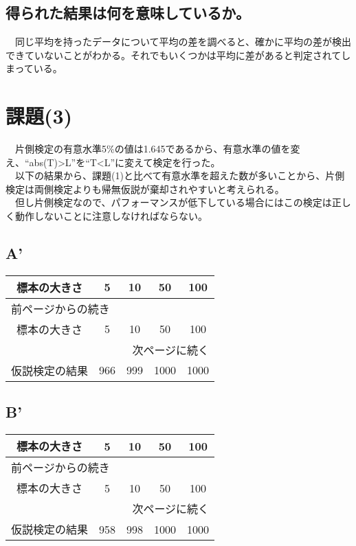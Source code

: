 \documentclass{scrartcl}
\begin{document}
\subsection{得られた結果は何を意味しているか。}
\label{sec:org8875bc8}
　同じ平均を持ったデータについて平均の差を調べると、確かに平均の差が検出できていないことがわかる。それでもいくつかは平均に差があると判定されてしまっている。\\
\section{課題(3)}
\label{sec:orgf0b86b8}
　片側検定の有意水準5\%の値は1.645であるから、有意水準の値を変え、``abs(T)>L''を``T<L''に変えて検定を行った。\\
　以下の結果から、課題(1)と比べて有意水準を超えた数が多いことから、片側検定は両側検定よりも帰無仮説が棄却されやすいと考えられる。\\
　但し片側検定なので、パフォーマンスが低下している場合にはこの検定は正しく動作しないことに注意しなければならない。\\
\subsection{A'}
\label{sec:orgecb1f9e}
\begin{longtable}{|c|c|c|c|c|}
\hline
標本の大きさ & 5 & 10 & 50 & 100\\
\hline
\endfirsthead
\multicolumn{5}{l}{前ページからの続き} \\
\hline

標本の大きさ & 5 & 10 & 50 & 100 \\

\hline
\endhead
\hline\multicolumn{5}{r}{次ページに続く} \\
\endfoot
\endlastfoot
\hline
仮説検定の結果 & 966 & 999 & 1000 & 1000\\
\hline
\end{longtable}
\subsection{B'}
\label{sec:org06e06b6}
\begin{longtable}{|c|c|c|c|c|}
\hline
標本の大きさ & 5 & 10 & 50 & 100\\
\hline
\endfirsthead
\multicolumn{5}{l}{前ページからの続き} \\
\hline

標本の大きさ & 5 & 10 & 50 & 100 \\

\hline
\endhead
\hline\multicolumn{5}{r}{次ページに続く} \\
\endfoot
\endlastfoot
\hline
仮説検定の結果 & 958 & 998 & 1000 & 1000\\
\hline
\end{longtable}
\end{document}
